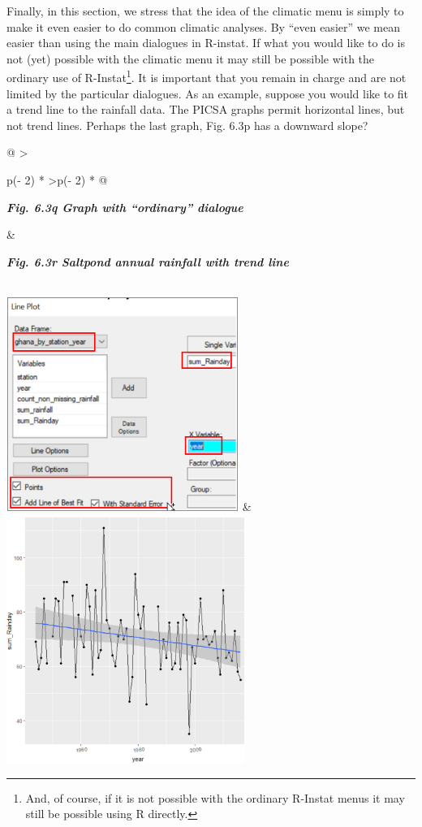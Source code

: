 \documentclass[
  letterpaper,
  DIV=11,
  numbers=noendperiod]{scrreprt}
\begin{document}
Finally, in this section, we stress that the idea of the climatic menu
is simply to make it even easier to do common climatic analyses. By
``even easier'' we mean easier than using the main dialogues in
R-instat. If what you would like to do is not (yet) possible with the
climatic menu it may still be possible with the ordinary use of
R-Instat\footnote{And, of course, if it is not possible with the
  ordinary R-Instat menus it may still be possible using R directly.}.
It is important that you remain in charge and are not limited by the
particular dialogues. As an example, suppose you would like to fit a
trend line to the rainfall data. The PICSA graphs permit horizontal
lines, but not trend lines. Perhaps the last graph, Fig. 6.3p has a
downward slope?

\begin{longtable}[]{@{}
  >{\raggedright\arraybackslash}p{(\columnwidth - 2\tabcolsep) * }
  >{\raggedleft\arraybackslash}p{(\columnwidth - 2\tabcolsep) * }@{}}
\toprule\noalign{}
\begin{minipage}[b]{\linewidth}\raggedright
\textbf{\emph{Fig. 6.3q Graph with ``ordinary'' dialogue}}
\end{minipage} & \begin{minipage}[b]{\linewidth}\raggedleft
\textbf{\emph{Fig. 6.3r Saltpond annual rainfall with trend line}}
\end{minipage} \\
\midrule\noalign{}
\endhead
\bottomrule\noalign{}
\endlastfoot
\includegraphics[width=2.98037in,height=2.74463in]{figures/Fig6.3q.png}
&
\includegraphics[width=3.05394in,height=3.17823in]{figures/Fig6.3r.png} \\
\end{longtable}
\end{document}
